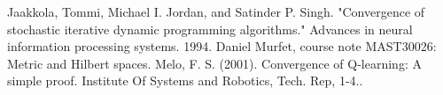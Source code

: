 \documentclass[a4paper]{article}
\theoremstyle{definition}
\begin{document}
\begin{thebibliography}{99}  
Jaakkola, Tommi, Michael I. Jordan, and Satinder P. Singh. "Convergence of stochastic iterative dynamic programming algorithms." Advances in neural information processing systems. 1994.  
Daniel Murfet, course note  MAST30026: Metric and Hilbert spaces.  
Melo, F. S. (2001). Convergence of Q-learning: A simple proof. Institute Of Systems and Robotics, Tech. Rep, 1-4..  

\end{thebibliography}
\end{document}
